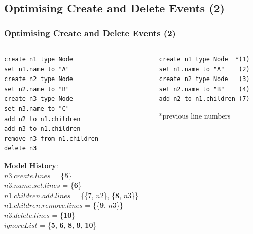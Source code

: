 \documentclass{beamer}
\begin{document}
\begin{frame}[fragile]
\section{Optimising Create and Delete Events (2)}
\frametitle{Optimising Create and Delete Events (2)}

\begin{columns}
\begin{column}[t]{0.5\linewidth}
\begin{lstlisting}[style=eol,caption={A tree model persisted in change-based.},label=lst:cbpmodel]
create n1 type Node
set n1.name to "A"  
create n2 type Node
set n2.name to "B"  
create n3 type Node
set n3.name to "C"  
add n2 to n1.children   
add n3 to n1.children
remove n3 from n1.children   
delete n3
\end{lstlisting}

\begin{footnotesize}
\textbf{Model History}:\\
$n3$.$create$.$lines$ = \{\textbf{5}\}\\ 
$n3$.$name$.$set$.$lines$ = \{\textbf{6}\}\\
$n1$.$children$.$add$.$lines$ = \{\{7, $n2$\}, \{\textbf{8}, $n3$\}\}\\
$n1$.$children$.$remove$.$lines$ = \{\{\textbf{9}, $n3$\}\}\\
$n3$.$delete$.$lines$ = \{\textbf{10}\}\\
$ignoreList$ = \{\textbf{5}, \textbf{6}, \textbf{8}, \textbf{9}, \textbf{10}\}
\end{footnotesize}

\end{column}

\begin{column}[t]{0.5\linewidth}
\begin{lstlisting}[style=eol,caption={A replay of the CBP in Listing 9 after optimisation.},label=lst:cbpmodel_optimised]
create n1 type Node  *(1)
set n1.name to "A"    (2)
create n2 type Node   (3)
set n2.name to "B"    (4)
add n2 to n1.children (7)
\end{lstlisting}
*previous line numbers\\
\end{column}
\end{columns}

\end{frame}
\end{document}
